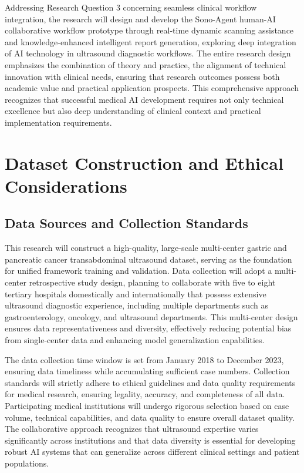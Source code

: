 Addressing Research Question 3 concerning seamless clinical workflow integration, the research will design and develop the Sono-Agent human-AI collaborative workflow prototype through real-time dynamic scanning assistance and knowledge-enhanced intelligent report generation, exploring deep integration of AI technology in ultrasound diagnostic workflows. The entire research design emphasizes the combination of theory and practice, the alignment of technical innovation with clinical needs, ensuring that research outcomes possess both academic value and practical application prospects. This comprehensive approach recognizes that successful medical AI development requires not only technical excellence but also deep understanding of clinical context and practical implementation requirements.

\section{Dataset Construction and Ethical Considerations}

\subsection{Data Sources and Collection Standards}

This research will construct a high-quality, large-scale multi-center gastric and pancreatic cancer transabdominal ultrasound dataset, serving as the foundation for unified framework training and validation. Data collection will adopt a multi-center retrospective study design, planning to collaborate with five to eight tertiary hospitals domestically and internationally that possess extensive ultrasound diagnostic experience, including multiple departments such as gastroenterology, oncology, and ultrasound departments. This multi-center design ensures data representativeness and diversity, effectively reducing potential bias from single-center data and enhancing model generalization capabilities.

The data collection time window is set from January 2018 to December 2023, ensuring data timeliness while accumulating sufficient case numbers. Collection standards will strictly adhere to ethical guidelines and data quality requirements for medical research, ensuring legality, accuracy, and completeness of all data. Participating medical institutions will undergo rigorous selection based on case volume, technical capabilities, and data quality to ensure overall dataset quality. The collaborative approach recognizes that ultrasound expertise varies significantly across institutions and that data diversity is essential for developing robust AI systems that can generalize across different clinical settings and patient populations.

